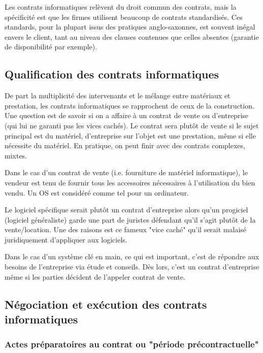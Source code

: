 \documentclass[fleqn,letterpaper, 12pt]{article}
\begin{document}
	Les contrats informatiques relèvent du droit commun des contrats, mais la spécificité est que les firmes utilisent beaucoup de contrats standardisés. Ces standards, pour la plupart issus des pratiques anglo-saxonnes, est souvent inégal envers le client, tant au niveau des clauses contenues que celles absentes (garantie de disponibilité par exemple).
	
	\subsection{Qualification des contrats informatiques}
	
	De part la multiplicité des intervenants et le mélange entre matériaux et prestation, les contrats informatiques se rapprochent de ceux de la construction. Une question est de savoir si on a affaire à un contrat de vente ou d'entreprise (qui lui ne garanti pas les vices cachés). Le contrat sera plutôt de vente si le sujet principal est du matériel, d'entreprise sur l'objet est une prestation, même si elle nécessite du matériel. En pratique, on peut finir avec des contrats complexes, mixtes.
	
	Dans le cas d'un contrat de vente (i.e. fourniture de matériel informatique), le vendeur est tenu de fournir tous les accessoires nécessaires à l'utilisation du bien vendu. Un OS est considéré comme tel pour un ordinateur.
	
	Le logiciel spécifique serait plutôt un contrat d'entreprise alors qu'un progiciel (logiciel généraliste) garde une part de juristes défendant qu'il s'agit plutôt de la vente/location. Une des raisons est ce fameux "vice caché" qu'il serait malaisé juridiquement d'appliquer aux logiciels.
	
	Dans le cas d'un système clé en main, ce qui est important, c'est de répondre aux besoins de l'entreprise via étude et conseils. Dès lors, c'est un contrat d'entreprise même si les parties décident de l'appeler contrat de vente.
	
	
	\subsection{Négociation et exécution des contrats informatiques}
	
	\subsubsection{Actes préparatoires au contrat ou "période précontractuelle"}
	
\end{document}

